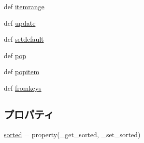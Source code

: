 \begin{DoxyCompactItemize}
\item 
def \hyperlink{classm5_1_1util_1_1sorteddict_1_1SortedDict_a8d553093aad148b18f0ea9907dfe028f}{itemrange}
\item 
def \hyperlink{classm5_1_1util_1_1sorteddict_1_1SortedDict_abe52b977c101e59f342489ed18140819}{update}
\item 
def \hyperlink{classm5_1_1util_1_1sorteddict_1_1SortedDict_a1af96fe42a8e8c54a0c606fb4f01df98}{setdefault}
\item 
def \hyperlink{classm5_1_1util_1_1sorteddict_1_1SortedDict_a3752d00352e543cac49d837935da714b}{pop}
\item 
def \hyperlink{classm5_1_1util_1_1sorteddict_1_1SortedDict_a4b16fca3b37082f2913c4e6595d85a4f}{popitem}
\item 
def \hyperlink{classm5_1_1util_1_1sorteddict_1_1SortedDict_ad967d0a16057fd802496e994ea5673b2}{fromkeys}
\end{DoxyCompactItemize}
\subsection*{プロパティ}
\begin{DoxyCompactItemize}
\item 
\hyperlink{classm5_1_1util_1_1sorteddict_1_1SortedDict_a4d28f6e51bf13f49077122951121dfc5}{sorted} = property(\_\-get\_\-sorted, \_\-set\_\-sorted)
\end{DoxyCompactItemize}
